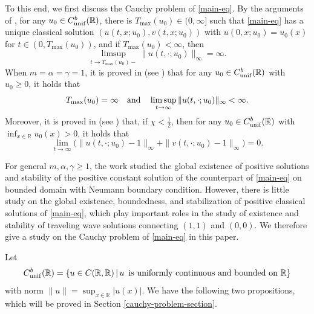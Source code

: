 \documentclass[11pt]{article} %
\theoremstyle{remark}
\theoremstyle{remark}
\numberwithin{equation}{section}
\numberwithin{figure}{section}
\numberwithin{table}{section}
\newcommand\RR{\ensuremath{\mathbb{R}}}
\begin{document}
To this end, we first discuss the Cauchy problem of \eqref{main-eq}.
By the arguments of \cite[Theorem 1.1]{SaSh2017}, for any $u_0\in C_{\rm unif}^b(\RR)$, there is
$T_{\max}(u_0)\in (0,\infty]$ such that \eqref{main-eq} has a unique classical solution
$(u(t,x;u_0), v(t,x;u_0))$ with $u(0,x;u_0)=u_0(x)$ for $t\in (0,T_{\max}(u_0))$, and if $T_{\max}(u_0)<\infty$, then
$$
\limsup_{t\to T_{\max}(u_0)-} \|u(t,\cdot;u_0)\|_\infty=\infty.
$$
When $m=\alpha=\gamma=1$, it is proved in \cite{HaShZh2024}  (see \cite[Theorem 1.4]{HaShZh2024}) that for any $u_0\in C_{\rm unif}^b(\RR)$ with $u_0\ge 0$,  it holds that 
\begin{equation}
\label{global-existence-eq0}
T_{\max}(u_0)=\infty\quad {\rm and}\quad 
\limsup_{t\to\infty} \|u(t,\cdot;u_0)\|_\infty<\infty.
\end{equation}
Moreover,  it is proved in  \cite{SaSh2019} (see \cite[Theorem B]{SaSh2019})  that, if $\chi<\frac{1}{2}$, then for any $u_0\in C_{\rm unif}^b(\RR)$ with $\inf_{x\in\RR}u_0(x)>0$, it holds that
\begin{equation}
\label{stability-eq0}
\lim_{t\to\infty} \Big(\|u(t,\cdot;u_0)-1\|_\infty+\|v(t,\cdot;u_0)-1\|_\infty\Big)=0.
\end{equation}

For general $m,\alpha,\gamma\ge 1$,  the work \cite{GaSaTe}  studied the global existence of positive solutions and stability of the positive constant solution of the counterpart of \eqref{main-eq} on bounded domain with Neumann boundary condition. 
However, there is little study on the global existence, boundedness, and stabilization of positive classical solutions of \eqref{main-eq}, which play important roles in the study of existence and stability of traveling wave solutions connecting $(1,1)$ and $(0,0)$.  We therefore give a study on the Cauchy problem  of \eqref{main-eq} in this paper. 


Let
$$
C_{\rm unif}^b(\RR)=\{u\in C(\RR,\RR)\,|\, u\,\,\, \text{is uniformly continuous and bounded on}\,\,\RR\}
$$
with norm $\|u\|=\sup_{x\in\RR}|u(x)|$.  We have
the following two propositions, which will be proved in Section \ref{cauchy-problem-section}.
\end{document}
